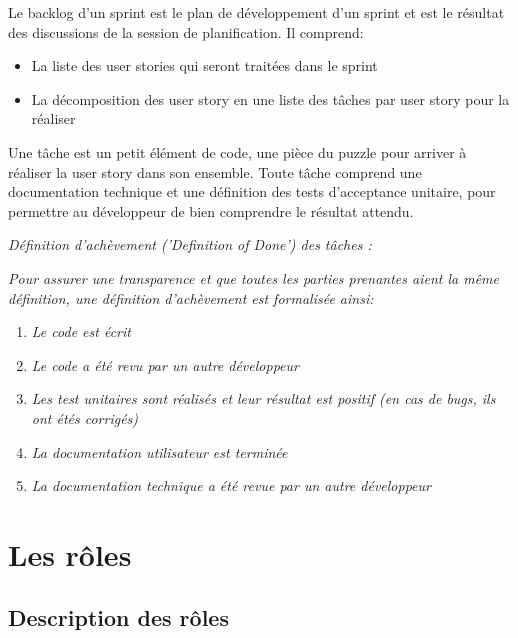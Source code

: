 Le backlog d’un sprint est le plan de développement d’un sprint et est le résultat des discussions 
de la session de planification. Il comprend:
\begin{itemize}
      \item La liste des user stories qui seront traitées dans le sprint
      \item La décomposition des user story en une liste des tâches par user story pour la réaliser
\end{itemize}

Une tâche est un petit élément de code, une pièce du puzzle pour arriver à réaliser la user story 
dans son ensemble.
Toute tâche comprend une documentation technique et une définition des tests d’acceptance unitaire, 
pour permettre au développeur de bien comprendre le résultat attendu. 

\noindent%
\hfill%
\begin{minipage}{12cm}
      \textsl{Définition d'achèvement ('Definition of Done') des tâches :}

      \textsl{Pour assurer une transparence et que toutes les parties prenantes aient la même définition, 
une définition d'achèvement est formalisée ainsi:}
\begin{enumerate}     
      \item \textsl{Le code est écrit}
      \item \textsl{Le code a été revu par un autre développeur}
      \item \textsl{Les test unitaires sont réalisés et leur résultat est positif (en cas de bugs, 
      ils ont étés corrigés)}
      \item \textsl{La documentation utilisateur est terminée}
      \item \textsl{La documentation technique a été revue par un autre développeur}
\end{enumerate}
\end{minipage}

\section{Les rôles}

\subsection{Description des rôles}

